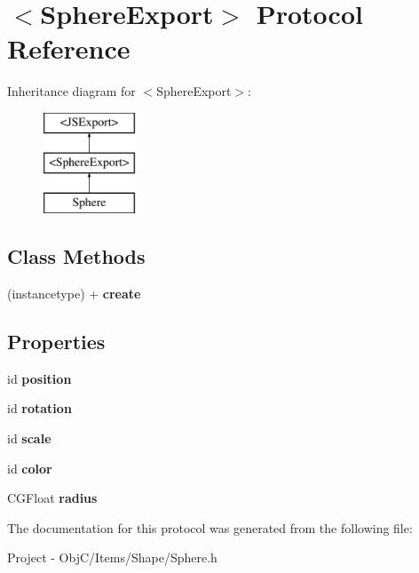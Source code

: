 \hypertarget{protocol_sphere_export-p}{}\section{$<$Sphere\+Export$>$ Protocol Reference}
\label{protocol_sphere_export-p}
Inheritance diagram for $<$Sphere\+Export$>$\+:\begin{figure}[H]
\begin{center}
\leavevmode
\includegraphics[height=3.000000cm]{protocol_sphere_export-p}
\end{center}
\end{figure}
\subsection*{Class Methods}
\begin{DoxyCompactItemize}
\item 
\hypertarget{protocol_sphere_export-p_a195474e4b1d56ead82cb597d31245f52}{}(instancetype) + {\bfseries create}\label{protocol_sphere_export-p_a195474e4b1d56ead82cb597d31245f52}

\end{DoxyCompactItemize}
\subsection*{Properties}
\begin{DoxyCompactItemize}
\item 
\hypertarget{protocol_sphere_export-p_a59c8bc82ecc4d9c5a35132cbad7f0dde}{}id {\bfseries position}\label{protocol_sphere_export-p_a59c8bc82ecc4d9c5a35132cbad7f0dde}

\item 
\hypertarget{protocol_sphere_export-p_a06b8010a1dd42fe984ded842c5cd6c87}{}id {\bfseries rotation}\label{protocol_sphere_export-p_a06b8010a1dd42fe984ded842c5cd6c87}

\item 
\hypertarget{protocol_sphere_export-p_af9b02dfefa941e65b552fed0dc7af685}{}id {\bfseries scale}\label{protocol_sphere_export-p_af9b02dfefa941e65b552fed0dc7af685}

\item 
\hypertarget{protocol_sphere_export-p_a91df1d0105eccdf31016c698e532508f}{}id {\bfseries color}\label{protocol_sphere_export-p_a91df1d0105eccdf31016c698e532508f}

\item 
\hypertarget{protocol_sphere_export-p_a114161e8b534d65227b3d76f01cfbcb7}{}C\+G\+Float {\bfseries radius}\label{protocol_sphere_export-p_a114161e8b534d65227b3d76f01cfbcb7}

\end{DoxyCompactItemize}


The documentation for this protocol was generated from the following file\+:\begin{DoxyCompactItemize}
\item 
Project -\/ Obj\+C/\+Items/\+Shape/Sphere.\+h\end{DoxyCompactItemize}

